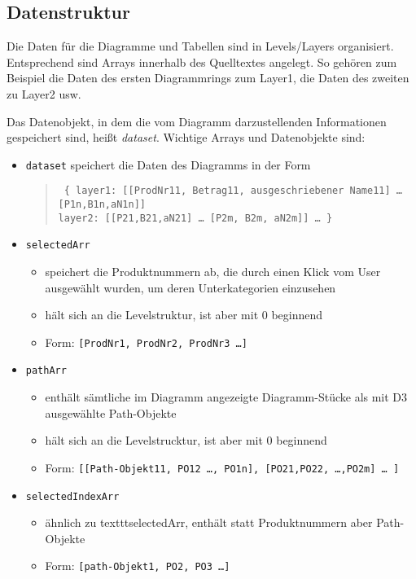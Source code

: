 \documentclass[a4paper,11pt,twoside]{article}
\begin{document}
\subsection{Datenstruktur}
Die Daten für die Diagramme und Tabellen sind in Levels/Layers organisiert.
Entsprechend sind Arrays innerhalb des Quelltextes angelegt. So gehören zum
Beispiel die Daten des ersten Diagrammrings zum Layer1, die Daten des zweiten
zu Layer2 usw.

Das Datenobjekt, in dem die vom Diagramm darzustellenden Informationen
gespeichert sind, heißt \emph{dataset}.  Wichtige Arrays und Datenobjekte
sind:
\begin{itemize}
\item \texttt{dataset} speichert die Daten des Diagramms in der Form
  \begin{quote}\tt
    \{ layer1: [[ProdNr11, Betrag11, ausgeschriebener Name11] {\ldots}\\{}
      [P1n,B1n,aN1n]]\\ layer2: [[P21,B21,aN21] {\ldots} [P2m, B2m, aN2m]]
       {\ldots} \}
  \end{quote}
\item \texttt{selectedArr} 
  \begin{itemize}
  \item speichert die Produktnummern ab, die durch einen Klick vom User
    ausgewählt wurden, um deren Unterkategorien einzusehen
  \item hält sich an die Levelstruktur, ist aber mit 0 beginnend
  \item Form: \texttt{[ProdNr1, ProdNr2, ProdNr3 {\ldots}]}
  \end{itemize}
\item \texttt{pathArr} 
  \begin{itemize}
  \item enthält sämtliche im Diagramm angezeigte Diagramm-Stücke als mit D3
    ausgewählte Path-Objekte 
  \item hält sich an die Levelstrucktur, ist aber mit 0 beginnend
  \item Form: \texttt{[[Path-Objekt11, PO12 {\ldots}, PO1n], [PO21,PO22,
        {\ldots},PO2m] {\ldots} ]}
  \end{itemize}
\item \texttt{selectedIndexArr}
  \begin{itemize}
  \item ähnlich zu texttt{selectedArr}, enthält statt Produktnummern aber
    Path-Objekte
  \item Form: \texttt{[path-Objekt1, PO2, PO3 {\ldots}]}
  \end{itemize}
\end{itemize}
\end{document}
